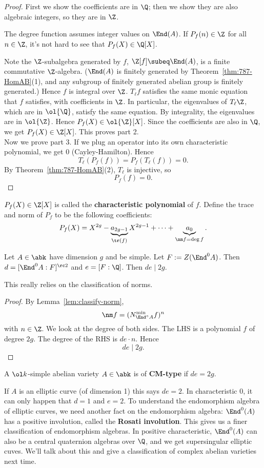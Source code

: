 \begin{proof}
First we show the coefficients are in $\Q$; then we show they are also algebraic integers, so they are in $\Z$.

The degree function assumes integer values on $\End(A)$. If $P_f(n)\in \Z$ for all $n\in \Z$, it's not hard to see that $P_f(X)\in \Q[X]$. %

Note the $\Z$-subalgebra generated by $f$, $\Z[f]\subeq \End(A)$, is a finite commutative $\Z$-algebra. 
($\End(A)$ is finitely generated by Theorem~\ref{thm:787-HomAB}(1), and any subgroup of finitely generated abelian group is finitely generated.) Hence $f$ is integral over $\Z$. $T_{\ell}f$ satisfies the same monic equation that $f$ satisfies, with coefficients in $\Z$. In particular, the eigenvalues of $T_{\ell}\Z$, which are in $\ol{\Q}$, satisfy the same equation. By integrality, the eigenvalues are in $\ol{\Z}$. Hence $P_f(X)\in \ol{\Z}[X]$. Since the coefficients are also in $\Q$, we get $P_f(X)\in \Z[X]$. This proves part 2.\\

Now we prove part 3. If we plug an operator into its own characteristic polynomial, we get 0 (Cayley-Hamilton). Hence
\[
T_{\ell}(P_f(f))= P_f(T_{\ell}(f))=0.
\]
By Theorem~\ref{thm:787-HomAB}(2), $T_{\ell}$ is injective, so
\[
P_f(f)=0.
\]
\end{proof}
\begin{df}
$P_f(X)\in \Z[X]$ is called the \textbf{characteristic polynomial} of $f$. Define the trace and norm of $P_f$ to be the following coefficients:
\[
P_f(X)=X^{2g}-\underbrace{a_{2g-1}}_{\tr(f)}X^{2g-1}+\cdots +\underbrace{a_0}_{\nm f=\deg f}.
\]
\end{df}
\begin{cor}
Let $A\in \abk$ have dimension $g$ and be simple. Let $F:=Z(\End^0A)$. Then $d=[\End^0A:F]^{\rc 2}$ and $e=[F:\Q]$. Then $de\mid 2g$.
\end{cor}
This really relies on the classification of norms.
\begin{proof}
By Lemma~\ref{lem:classify-norm}, 
\[
\nm f=(N_{\End^{\circ}A}^{\min}f)^n
\]
with $n\in \Z$. We look at the degree of both sides.  The LHS is a polynomial $f$ of degree $2g$. The degree of the RHS is $de\cdot n$. Hence
\[
de\mid 2g.
\]
\end{proof}
\begin{df}
A $\ol k$-simple abelian variety $A\in \abk$ is of \textbf{CM-type} if $de=2g$.
\end{df}
If $A$ is an elliptic curve (of dimension 1) this says $de=2$. In characteristic 0, it can only happen that $d=1$ and $e=2$. To understand the endomorphism algebra of elliptic curves, we need another fact on the endomorphism algebra: $\End^0(A)$ has a positive involution, called the \textbf{Rosati involution}. This gives us a finer classification of endomorphism algebras. 
In positive characteristic, $\End^0(A)$ can also be a central quaternion algebras over $\Q$, and we get supersingular elliptic cuves.
We'll talk about this and give a classification of complex abelian varieties next time.